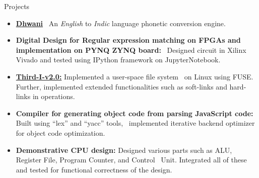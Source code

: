 \documentclass{CV} %
\begin{document}

\begin{rSection}{Projects}

  \begin{itemize}

  \item \textbf{\href{https://ndyashas.github.io/projects/Dhwani.html}{Dhwani}} \
    An \textit{English} to \textit{Indic} language phonetic conversion engine. 
    
  \item \textbf{Digital Design for Regular expression matching on FPGAs and implementation on PYNQ ZYNQ board:} \
    Designed circuit in Xilinx Vivado and tested using IPython framework on JupyterNotebook.

  \item \textbf{\href{https://github.com/ndyashas/Third-I-v2.0}{Third-I-v2.0:}} Implemented a user-space file system \
    on Linux using FUSE. Further, implemented extended functionalities such as soft-links and hard-links in operations.

  \item \textbf{Compiler for generating object code from parsing JavaScript code:} Built using ``lex'' and ``yacc'' tools, \
    implemented iterative backend optimizer for object code optimization.

  \item \textbf{Demonstrative CPU design:} Designed various parts such as ALU, Register File, Program Counter, and Control \
    Unit. Integrated all of these and tested for functional correctness of the design.
    
  \end{itemize}
  
\end{rSection}


\end{document}
